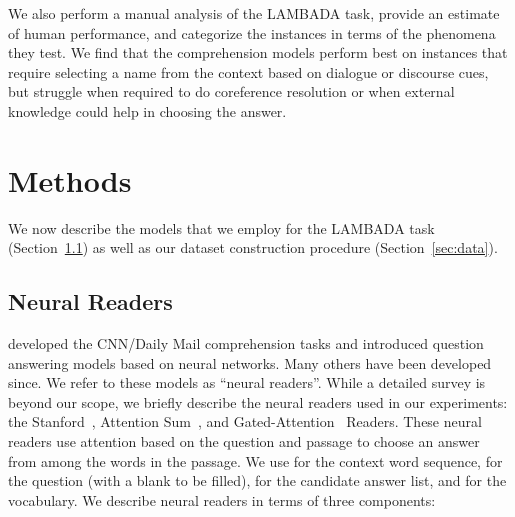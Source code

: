 \documentclass[11pt]{article}
\newcommand{\modelname}{neural readers\xspace}
\begin{document}
We also perform a manual analysis of the LAMBADA task, provide an estimate of human performance, and categorize the instances in terms of the phenomena they test. We find that the comprehension models perform best on instances that require selecting a name from the context based on dialogue or discourse cues, but struggle when required to do coreference resolution or when  external knowledge could help in choosing the answer. 

\section{Methods}

We now describe the models that we employ for the LAMBADA task (Section~\ref{sec:readers}) as well as our dataset construction procedure (Section~\ref{sec:data}). 

\subsection{Neural Readers}
\label{sec:readers}
 developed the CNN/Daily Mail comprehension tasks and introduced question answering models based on neural networks. Many others have been developed since. 
We refer to these models as ``\modelname''. While a detailed survey is beyond our scope, we briefly describe the \modelname used in our experiments: the Stanford~\cite{danqi-reader:16}, Attention Sum~\cite{as-reader:16}, and Gated-Attention~\cite{gated-as-reader:16} Readers. These \modelname use attention based on the question and passage to choose an answer from among the words in the passage. 
We use  for the context word sequence,  for the question  (with a blank to be filled),  for the candidate answer list, and  for the vocabulary. We describe neural readers in terms of three components:
\end{document}
